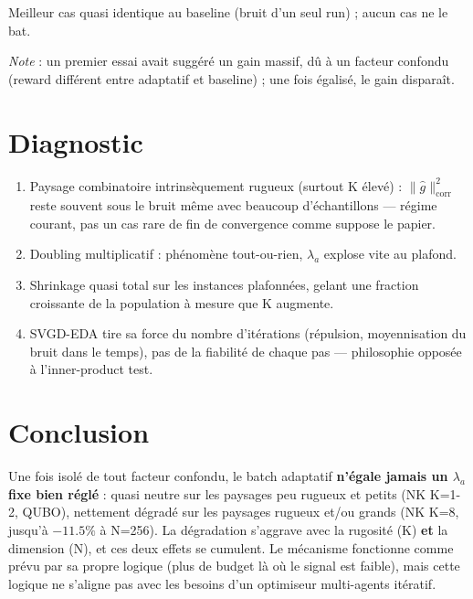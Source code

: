 \documentclass{article}
\begin{document}
Meilleur cas quasi identique au baseline (bruit d'un seul run) ; aucun cas ne le bat.

\textit{Note} : un premier essai avait suggéré un gain massif, dû à un facteur confondu (reward
différent entre adaptatif et baseline) ; une fois égalisé, le gain disparaît.

\section{Diagnostic}

\begin{enumerate}
  \item Paysage combinatoire intrinsèquement rugueux (surtout K élevé) : $\|\hat
    g\|^2_{\mathrm{corr}}$ reste souvent sous le bruit même avec beaucoup d'échantillons —
    régime courant, pas un cas rare de fin de convergence comme suppose le papier.
  \item Doubling multiplicatif : phénomène tout-ou-rien, $\lambda_a$ explose vite au plafond.
  \item Shrinkage quasi total sur les instances plafonnées, gelant une fraction croissante de
    la population à mesure que K augmente.
  \item SVGD-EDA tire sa force du nombre d'itérations (répulsion, moyennisation du bruit dans
    le temps), pas de la fiabilité de chaque pas — philosophie opposée à l'inner-product test.
\end{enumerate}

\section{Conclusion}

Une fois isolé de tout facteur confondu, le batch adaptatif \textbf{n'égale jamais un
$\lambda_a$ fixe bien réglé} : quasi neutre sur les paysages peu rugueux et petits (NK K=1-2,
QUBO), nettement dégradé sur les paysages rugueux et/ou grands (NK K=8, jusqu'à $-11.5\%$ à
N=256). La dégradation s'aggrave avec la rugosité (K) \textbf{et} la dimension (N), et ces deux
effets se cumulent. Le mécanisme fonctionne comme prévu par sa propre logique (plus de budget
là où le signal est faible), mais cette logique ne s'aligne pas avec les besoins d'un
optimiseur multi-agents itératif.
\end{document}
